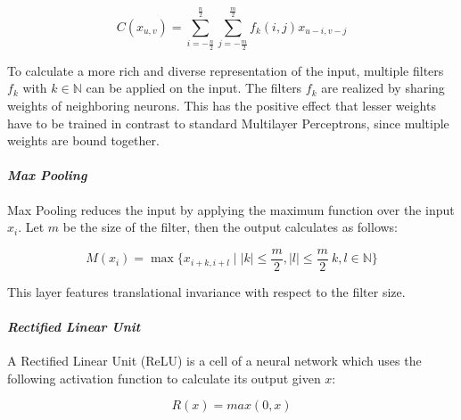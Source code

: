 \documentclass[10pt,journal,compsoc, hidelinks]{IEEEtran}
\newcommand{\paraV}{\vspace{1em}}
\begin{document}
\begin{center}
\begin{minipage}{0.8\columnwidth}
\begin{equation}
C(x_{u,v}) = \sum_{i=-\frac{n}{2}}^{\frac{n}{2}}\sum_{j=-\frac{m}{2}}^{\frac{m}{2}}f_k(i,j) x_{u-i,v-j}
\end{equation}
\end{minipage}
\end{center}

To calculate a more rich and diverse representation of the input, multiple filters $f_k$ with $k \in \mathbb{N}$ can be applied on the input. The filters $f_k$ are realized by sharing weights of neighboring neurons. This has the positive effect that lesser weights have to be trained in contrast to standard Multilayer Perceptrons, since multiple weights are bound together.



\paraV
\paragraph{\textit{Max Pooling}}

Max Pooling reduces the input by applying the maximum function over the input $x_i$. Let $m$ be the size of the filter, then the output calculates as follows:


\begin{center}
\begin{minipage}{1\columnwidth}
\begin{equation}
M(x_i) = \max\{x_{i+k, i+l} \mid |k| \leq \frac{m}{2}, |l| \leq \frac{m}{2}\ k,l \in \mathbb{N}\}
\end{equation}
\end{minipage}
\end{center}

This layer features translational invariance with respect to the filter size.

\paraV
\paragraph{\textit{Rectified Linear Unit}}
A Rectified Linear Unit (ReLU) is a cell of a neural network which uses the following activation function to calculate its output given $x$:


\begin{center}
\begin{minipage}{0.44\columnwidth}
\begin{equation}
R(x) = max(0, x)
\end{equation}
\end{minipage}
\end{center}
\end{document}
